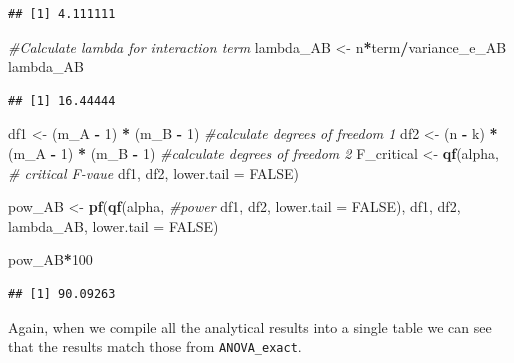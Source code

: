 \documentclass[]{book}
\newenvironment{Shaded}{\begin{snugshade}}{\end{snugshade}}
\newcommand{\CommentTok}[1]{\textcolor[rgb]{0.56,0.35,0.01}{\textit{#1}}}
\newcommand{\DataTypeTok}[1]{\textcolor[rgb]{0.13,0.29,0.53}{#1}}
\newcommand{\DecValTok}[1]{\textcolor[rgb]{0.00,0.00,0.81}{#1}}
\newcommand{\KeywordTok}[1]{\textcolor[rgb]{0.13,0.29,0.53}{\textbf{#1}}}
\newcommand{\NormalTok}[1]{#1}
\newcommand{\OperatorTok}[1]{\textcolor[rgb]{0.81,0.36,0.00}{\textbf{#1}}}
\newcommand{\OtherTok}[1]{\textcolor[rgb]{0.56,0.35,0.01}{#1}}
\newcommand{\StringTok}[1]{\textcolor[rgb]{0.31,0.60,0.02}{#1}}
\begin{document}
\begin{verbatim}
## [1] 4.111111
\end{verbatim}

\begin{Shaded}
\begin{Highlighting}[]
\CommentTok{#Calculate lambda for interaction term}
\NormalTok{lambda_AB <-}\StringTok{ }\NormalTok{n}\OperatorTok{*}\NormalTok{term}\OperatorTok{/}\NormalTok{variance_e_AB}
\NormalTok{lambda_AB}
\end{Highlighting}
\end{Shaded}

\begin{verbatim}
## [1] 16.44444
\end{verbatim}

\begin{Shaded}
\begin{Highlighting}[]
\NormalTok{df1 <-}\StringTok{ }\NormalTok{(m_A }\OperatorTok{-}\StringTok{ }\DecValTok{1}\NormalTok{) }\OperatorTok{*}\StringTok{ }\NormalTok{(m_B }\OperatorTok{-}\StringTok{ }\DecValTok{1}\NormalTok{)  }\CommentTok{#calculate degrees of freedom 1}
\NormalTok{df2 <-}
\NormalTok{(n }\OperatorTok{-}\StringTok{ }\NormalTok{k) }\OperatorTok{*}\StringTok{ }\NormalTok{(m_A }\OperatorTok{-}\StringTok{ }\DecValTok{1}\NormalTok{) }\OperatorTok{*}\StringTok{ }\NormalTok{(m_B }\OperatorTok{-}\StringTok{ }\DecValTok{1}\NormalTok{) }\CommentTok{#calculate degrees of freedom 2}
\NormalTok{F_critical <-}\StringTok{ }\KeywordTok{qf}\NormalTok{(alpha, }\CommentTok{# critical F-vaue}
\NormalTok{df1,}
\NormalTok{df2,}
\DataTypeTok{lower.tail =} \OtherTok{FALSE}\NormalTok{)}

\NormalTok{pow_AB <-}\StringTok{ }\KeywordTok{pf}\NormalTok{(}\KeywordTok{qf}\NormalTok{(alpha, }\CommentTok{#power}
\NormalTok{df1,}
\NormalTok{df2,}
\DataTypeTok{lower.tail =} \OtherTok{FALSE}\NormalTok{),}
\NormalTok{df1,}
\NormalTok{df2,}
\NormalTok{lambda_AB,}
\DataTypeTok{lower.tail =} \OtherTok{FALSE}\NormalTok{)}

\NormalTok{pow_AB}\OperatorTok{*}\DecValTok{100}
\end{Highlighting}
\end{Shaded}

\begin{verbatim}
## [1] 90.09263
\end{verbatim}

Again, when we compile all the analytical results into a single table we can see that the results match those from \texttt{ANOVA\_exact}.
\end{document}
